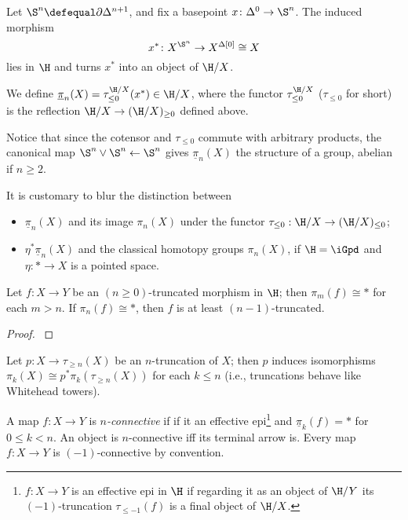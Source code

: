 \documentclass[10pt,a4paper]{amsart}
\begin{document}
\begin{definition}
Let $\S^n \defequal \partial\Delta^{n+1}$, and fix a basepoint $x \colon \Delta^0 \to \S^n$. The induced morphism
\[
x^* \colon X^{\S^n} \to X^{\Delta[0]}\cong X
\]
lies in $\H$ and turns $x^*$ into an object of $\H/X$.

We define $\underline{\pi}_n(X) = \tau_{\le 0}^{\H/X}(x^*) \in \H/X$, where the functor $\tau_{\le 0}^{\H/X}$ ($\tau_{\le 0}$ for short) is the reflection $\H/X \to (\H/X)_{\ge 0}$ defined above.
\end{definition}
Notice that since the cotensor and $\tau_{\le 0}$ commute with arbitrary products, the canonical map $\S^n\vee \S^n \leftarrow \S^n$ gives $\underline{\pi}_n(X)$ the structure of a group, abelian if $n\ge 2$.
\begin{notat}
It is customary to blur the distinction between
\begin{itemize}
	\item $\underline{\pi}_n(X)$ and its image $\pi_n(X)$ under the functor $\tau_{\le 0} : \H/X \to (\H/X)_{\le 0}$;
	\item $\eta^*\underline{\pi}_n(X)$ and the classical homotopy groups $\pi_n(X)$, if $\H=\iGpd$ and $\eta : * \to X$ is a pointed space.
\end{itemize}
\end{notat}
\begin{proposition}
Let $f : X \to Y$ be an $(n\ge 0)$-truncated morphism in $\H$; then $\pi_m(f) \cong *$ for each $m > n$. If $\pi_n(f) \cong *$, then $f$ is at least $(n-1)$-truncated.
\end{proposition}
\begin{proof}
\cite[6.5.1.7]{HTT}
\end{proof}
\begin{proposition}
Let $p : X \to \tau_{\ge n}(X)$ be an $n$-truncation of $X$; then $p$ induces isomorphisms $\pi_k(X) \cong p^* \pi_k(\tau_{\ge n}(X))$ for each $k \le n$ (i.e., truncations behave like Whitehead towers).
\end{proposition}
\begin{definition}
A map $f : X \to Y$ is \emph{$n$-connective} if if it an effective epi\footnote{$f : X \to Y$ is an effective epi in $\H$ if regarding it as an object of $\H/Y$ its $(-1)$-truncation $\tau_{\le -1}(f)$ is a final object of $\H/X$.} and $\underline{\pi}_k(f) = *$ for $0\le k < n$. An object is $n$-connective iff its terminal arrow is. Every map $f : X \to Y$ is $(-1)$-connective by convention.
\end{definition}
\end{document}
